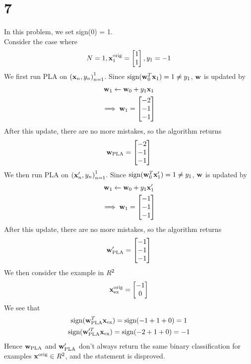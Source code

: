 \documentclass[11pt]{article}
\let\mathbb\relax
\theoremstyle{definition}
\begin{document}
\section*{7}
In this problem, we set sign(0) = 1. \\ 
Consider the case where
\begin{gather*}
  N = 1, 
  \vb{x}_1^\text{orig} =
  \begin{bmatrix}
    1 \\ 
    1 
  \end{bmatrix}, 
  y_1 = -1
\end{gather*}
We first run PLA on ${(\vb{x}_n, y_n)}_{n = 1}^1$. Since $\text{sign}(\vb{w}_0^T\vb{x}_1) = 1 \neq y_1$, $\vb{w}$ is updated by
\begin{gather*}
  \vb{w}_1\leftarrow\vb{w}_0 + y_1\vb{x}_1 \\ 
  \implies \vb{w}_1 = \begin{bmatrix}
    -2 \\
    -1 \\ 
    -1
  \end{bmatrix}
\end{gather*}
After this update, there are no more mistakes, so the algorithm returns
\[
  \vb{w}_\text{PLA} = \begin{bmatrix}
    -2 \\ 
    -1 \\
    -1
  \end{bmatrix}
\]
We then run PLA on ${(\vb{x}^\prime_n, y_n)}_{n = 1}^1$. Since $\text{sign}(\vb{w}_0^T\vb{x}^\prime_1) = 1 \neq y_1$, $\vb{w}$ is updated by
\begin{gather*}
  \vb{w}_1\leftarrow\vb{w}_0 + y_1\vb{x}^\prime_1 \\ 
  \implies \vb{w}_1 = \begin{bmatrix}
    -1 \\
    -1 \\ 
    -1
  \end{bmatrix}
\end{gather*}
After this update, there are no more mistakes, so the algorithm returns
\[
  \vb{w}^\prime_\text{PLA} = \begin{bmatrix}
    -1 \\ 
    -1 \\
    -1
  \end{bmatrix}
\]
We then consider the example in $\mathbb{R}^2$
\[
  \vb{x}_\text{ex}^\text{orig} = \begin{bmatrix}
    -1 \\ 
    0 \\
  \end{bmatrix}
\]
We see that 
\begin{gather*}
  \text{sign}(\vb{w}_\text{PLA}^T\vb{x}_\text{ex}) = \text{sign}(-1 + 1 + 0) = 1 \\ 
  \text{sign}(\vb{w}_\text{PLA}^{\prime T}\vb{x}_\text{ex}) = \text{sign}(-2 + 1 + 0) = -1 \\
\end{gather*}
Hence $\vb{w}_\text{PLA}$ and $\vb{w}_\text{PLA}^\prime$ don't always return the same binary classification for examples $\vb{x}^\text{orig} \in \mathbb{R}^2$, and the statement is disproved.
\newpage
\end{document}
